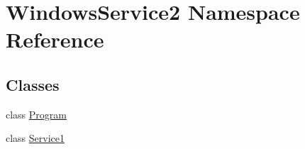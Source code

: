 \hypertarget{namespace_windows_service2}{}\section{Windows\+Service2 Namespace Reference}
\label{namespace_windows_service2}
\subsection*{Classes}
\begin{DoxyCompactItemize}
\item 
class \mbox{\hyperlink{class_windows_service2_1_1_program}{Program}}
\item 
class \mbox{\hyperlink{class_windows_service2_1_1_service1}{Service1}}
\end{DoxyCompactItemize}
